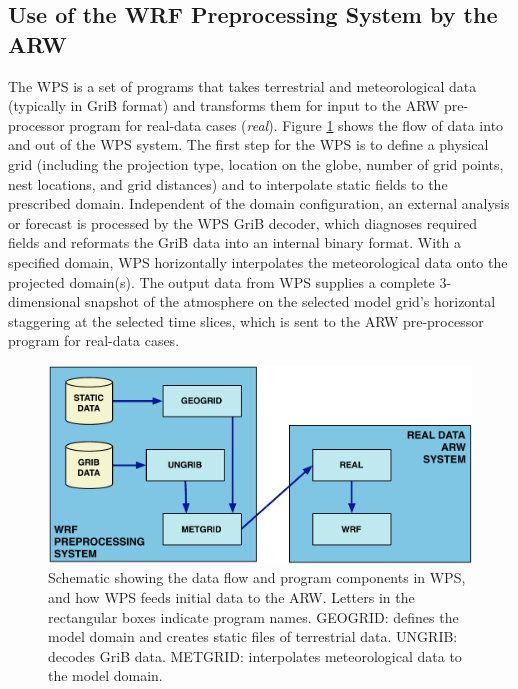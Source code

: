 \subsection{Use of the WRF Preprocessing System by the ARW}

The WPS is a set of programs that takes
terrestrial and meteorological data (typically in GriB format) and transforms them for input to
the ARW pre-processor program for real-data cases ({\it real}).
Figure \ref {figure:WPS_real_wrf} shows the flow of data into and out of the WPS system.  
The first step for the WPS is to define a physical grid (including
the projection type, location on the globe, 
number of grid points, nest locations, and grid distances) and
to interpolate static fields to the prescribed domain.
Independent of the domain configuration,
an external analysis or forecast is processed by the WPS GriB decoder,
which diagnoses required fields and
reformats the GriB data into an internal binary format.
With a specified domain,
WPS horizontally interpolates the meteorological data onto the projected domain(s). 
The output data from WPS supplies a complete 3-dimensional snapshot of the atmosphere
on the selected model grid's horizontal staggering at the selected time slices,
which is sent to the ARW pre-processor program for real-data cases.

%
%
\begin{figure}
  \centering
  \includegraphics[width=6in]{figures/WPS_real_wrf.pdf}
  \caption{\label{figure:WPS_real_wrf}Schematic showing 
the data flow and program components in WPS, and how WPS feeds initial data to the ARW.
Letters in the rectangular boxes indicate program names.
GEOGRID: defines the model domain and creates static files of terrestrial data.  UNGRIB:
decodes GriB data. METGRID: interpolates meteorological data to the model domain.}
\end{figure}

